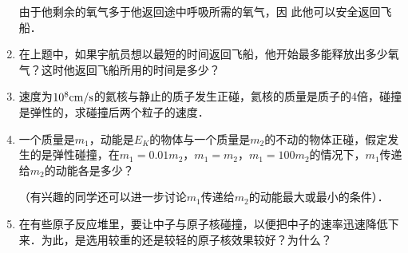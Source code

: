 \begin{enumerate}
\begin{solution}
由于他剩余的氧气多于他返回途中呼吸所需的氧气，因
此他可以安全返回飞船．
\end{solution}

\item 在上题中，如果宇航员想以最短的时间返回飞船，他开始最多能释放出多少氧气？这时他返回飞船所用的时间是多少？
\item 速度为$10^8{\rm cm}/{\rm s}$的氦核与静止的质子发生正碰，氦核的质量是质子的4倍，碰撞是弹性的，求碰撞后两个粒子的速度．
\item 一个质量是$m_1$，动能是$E_K$的物体与一个质量是$m_2$的不动的物体正碰，假定发生的是弹性碰撞，在$m_1=0.01m_2$，$m_1=m_2$，$m_1=100m_2$的情况下，$m_1$传递给$m_2$的动能各是多少？

（有兴趣的同学还可以进一步讨论$m_1$传递给$m_2$的动能最大或最小的条件）．

\item 在有些原子反应堆里，要让中子与原子核碰撞，以便把中子的速率迅速降低下来．为此，是选用较重的还是较轻的原子核效果较好？为什么？
\end{enumerate}

